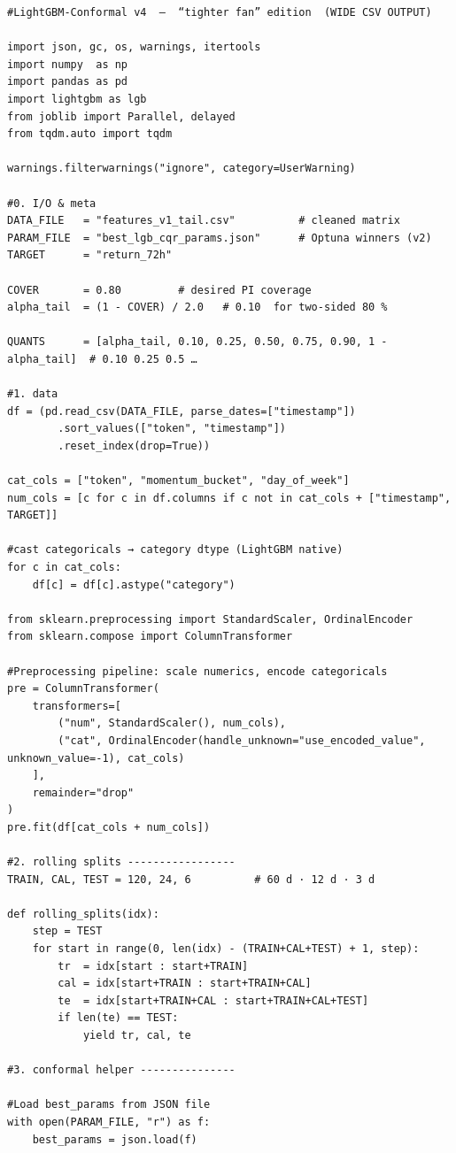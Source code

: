 \documentclass[
  a4paper,
  DIV=11,
  numbers=noendperiod]{scrreprt}
\begin{document}
\begin{verbatim}
#LightGBM-Conformal v4  –  “tighter fan” edition  (WIDE CSV OUTPUT)

import json, gc, os, warnings, itertools
import numpy  as np
import pandas as pd
import lightgbm as lgb
from joblib import Parallel, delayed
from tqdm.auto import tqdm

warnings.filterwarnings("ignore", category=UserWarning)

#0. I/O & meta 
DATA_FILE   = "features_v1_tail.csv"          # cleaned matrix
PARAM_FILE  = "best_lgb_cqr_params.json"      # Optuna winners (v2)
TARGET      = "return_72h"

COVER       = 0.80         # desired PI coverage
alpha_tail  = (1 - COVER) / 2.0   # 0.10  for two-sided 80 %

QUANTS      = [alpha_tail, 0.10, 0.25, 0.50, 0.75, 0.90, 1 - alpha_tail]  # 0.10 0.25 0.5 …

#1. data 
df = (pd.read_csv(DATA_FILE, parse_dates=["timestamp"])
        .sort_values(["token", "timestamp"])
        .reset_index(drop=True))

cat_cols = ["token", "momentum_bucket", "day_of_week"]
num_cols = [c for c in df.columns if c not in cat_cols + ["timestamp", TARGET]]

#cast categoricals → category dtype (LightGBM native)
for c in cat_cols:
    df[c] = df[c].astype("category")

from sklearn.preprocessing import StandardScaler, OrdinalEncoder
from sklearn.compose import ColumnTransformer

#Preprocessing pipeline: scale numerics, encode categoricals
pre = ColumnTransformer(
    transformers=[
        ("num", StandardScaler(), num_cols),
        ("cat", OrdinalEncoder(handle_unknown="use_encoded_value", unknown_value=-1), cat_cols)
    ],
    remainder="drop"
)
pre.fit(df[cat_cols + num_cols])

#2. rolling splits -----------------
TRAIN, CAL, TEST = 120, 24, 6          # 60 d · 12 d · 3 d

def rolling_splits(idx):
    step = TEST
    for start in range(0, len(idx) - (TRAIN+CAL+TEST) + 1, step):
        tr  = idx[start : start+TRAIN]
        cal = idx[start+TRAIN : start+TRAIN+CAL]
        te  = idx[start+TRAIN+CAL : start+TRAIN+CAL+TEST]
        if len(te) == TEST:
            yield tr, cal, te

#3. conformal helper ---------------

#Load best_params from JSON file
with open(PARAM_FILE, "r") as f:
    best_params = json.load(f)


\end{verbatim}
\end{document}
